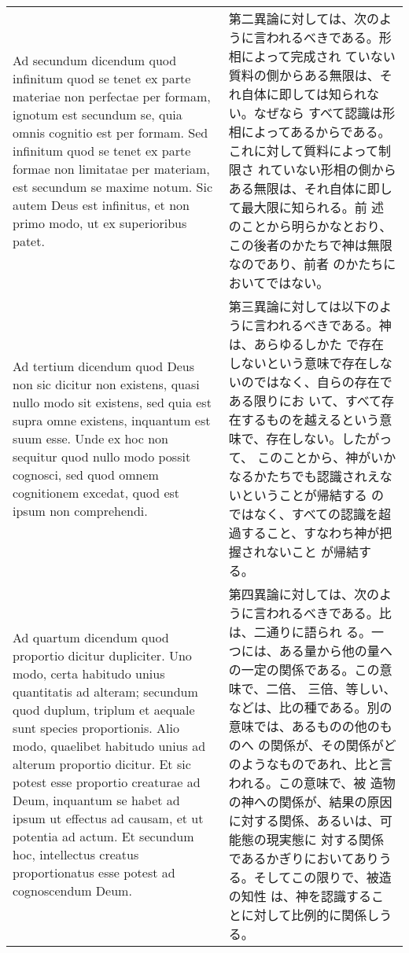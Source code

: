 \documentclass[10pt]{jsarticle} %
\begin{document}
\begin{longtable}{p{21em}p{21em}}
\\

{\sc  Ad secundum dicendum} quod infinitum quod se tenet ex parte
 materiae non perfectae per formam, ignotum est secundum se, quia omnis
 cognitio est per formam. Sed infinitum quod se tenet ex parte formae
 non limitatae per materiam, est secundum se maxime notum. Sic autem
 Deus est infinitus, et non primo modo, ut ex superioribus patet.

&

第二異論に対しては、次のように言われるべきである。形相によって完成され
ていない質料の側からある無限は、それ自体に即しては知られない。なぜなら
すべて認識は形相によってあるからである。これに対して質料によって制限さ
れていない形相の側からある無限は、それ自体に即して最大限に知られる。前
述のことから明らかなとおり、この後者のかたちで神は無限なのであり、前者
のかたちにおいてではない。

\\

{\sc  Ad tertium dicendum} quod Deus non sic dicitur non existens,
 quasi nullo modo sit existens, sed quia est supra omne existens,
 inquantum est suum esse. Unde ex hoc non sequitur quod nullo modo
 possit cognosci, sed quod omnem cognitionem excedat, quod est ipsum non
 comprehendi.

&

第三異論に対しては以下のように言われるべきである。神は、あらゆるしかた
で存在しないという意味で存在しないのではなく、自らの存在である限りにお
いて、すべて存在するものを越えるという意味で、存在しない。したがって、
このことから、神がいかなるかたちでも認識されえないということが帰結する
のではなく、すべての認識を超過すること、すなわち神が把握されないこと
が帰結する。


\\


{\sc Ad quartum dicendum} quod proportio dicitur dupliciter. Uno modo,
certa habitudo unius quantitatis ad alteram; secundum quod duplum,
triplum et aequale sunt species proportionis. Alio modo, quaelibet
habitudo unius ad alterum proportio dicitur. Et sic potest esse
proportio creaturae ad Deum, inquantum se habet ad ipsum ut effectus
ad causam, et ut potentia ad actum. Et secundum hoc, intellectus
creatus proportionatus esse potest ad cognoscendum Deum.

&

第四異論に対しては、次のように言われるべきである。比は、二通りに語られ
る。一つには、ある量から他の量への一定の関係である。この意味で、二倍、
三倍、等しい、などは、比の種である。別の意味では、あるものの他のものへ
の関係が、その関係がどのようなものであれ、比と言われる。この意味で、被
造物の神への関係が、結果の原因に対する関係、あるいは、可能態の現実態に
対する関係であるかぎりにおいてありうる。そしてこの限りで、被造の知性
は、神を認識することに対して比例的に関係しうる。


\end{longtable}
\end{document}
